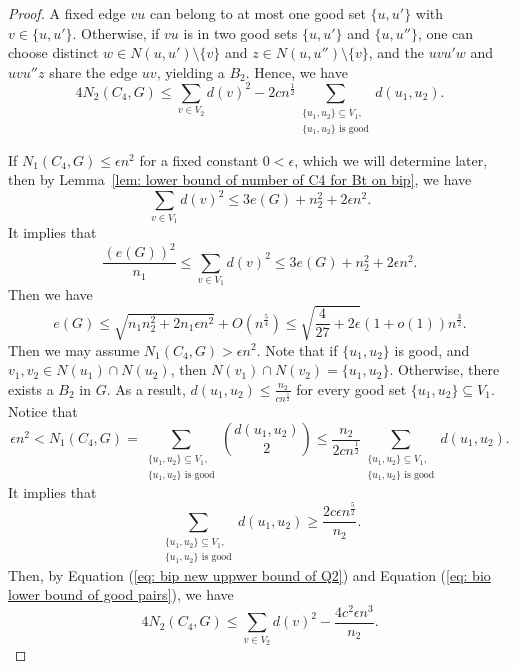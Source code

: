 \documentclass[11pt,a4paper]{article}
\theoremstyle{definition}
\begin{document}
\begin{proof}
            A fixed edge $vu$ can belong to at most one good set $\{u, u'\}$ with $v \in \{u, u'\}$.
            Otherwise, if $vu$ is in two good sets $\{u, u'\}$ and $\{u, u''\}$, one can choose distinct $w \in N(u, u') \setminus \{v\}$ and $z \in N(u, u'') \setminus \{v\}$, and the $u v u' w$ and $u v u'' z$ share the edge $uv$, yielding a $B_2$.
            Hence, we have
            \begin{equation}\label{eq: bip new uppwer bound of Q2}
                4N_2(C_4, G)\leq \sum_{v\in V_2} d(v)^2- 2cn^{\frac{1}{2}} \sum_{\substack{\{u_1,u_2\}\subseteq V_1, \\\{u_1,u_2\}\text{ is good}}}d(u_1,u_2).
            \end{equation}

            If $N_1(C_4, G)\leq \epsilon n^2$ for a fixed constant $0<\epsilon$, which we will determine later, then by Lemma~\ref{lem: lower bound of number of C4 for Bt on bip}, we have
            $$\sum_{v\in V_1}d(v)^2\leq 3e(G)+n_2^2+2\epsilon n^2.$$
            It implies that
            $$\frac{(e(G))^2}{n_1}\leq \sum_{v\in V_1}d(v)^2\leq 3e(G)+n_2^2+2\epsilon n^2.$$
            Then we have
            $$e(G)\leq \sqrt{n_1n_2^2+2n_1\epsilon n^2}+O(n^{\frac{5}{4}})\leq \sqrt{\frac{4}{27}+2\epsilon}(1+o(1))n^{\frac{3}{2}}.$$
            Then we may assume $N_1(C_4, G)>\epsilon n^2$.
            Note that if $\{u_1,u_2\}$ is good, and $v_1,v_2\in N(u_1)\cap N(u_2)$, then $N(v_1)\cap N(v_2)=\{u_1,u_2\}$.
            Otherwise, there exists a $B_2$ in $G$.
            As a result, $d(u_1,u_2)\leq \frac{n_2}{cn^{\frac{1}{2}}}$ for every good set $\{u_1,u_2\}\subseteq V_1$.
            Notice that
            $$\epsilon n^2<N_1(C_4, G)=\sum_{\substack{\{u_1,u_2\}\subseteq V_1, \\ \{u_1,u_2\}\text{ is good}}}\binom{d(u_1,u_2)}{2}\leq \frac{n_2}{2cn^{\frac{1}{2}}}\sum_{\substack{\{u_1,u_2\}\subseteq V_1, \\  \{u_1,u_2\}\text{ is good}}}d(u_1,u_2).$$
            It implies that
            \begin{equation}\label{eq: bio lower bound of good pairs}
                \sum_{\substack{\{u_1,u_2\}\subseteq V_1, \\ \{u_1,u_2\}\text{ is good}}}d(u_1,u_2)\geq \frac{2c\epsilon n^{\frac{5}{2}}}{n_2}.
            \end{equation}
            Then, by Equation (\ref{eq: bip new uppwer bound of Q2}) and Equation (\ref{eq: bio lower bound of good pairs}), we have
            $$4N_2(C_4, G)\leq \sum_{v\in V_2} d(v)^2- \frac{4c^2\epsilon n^{3}}{n_2}.$$

\end{proof}
\end{document}
